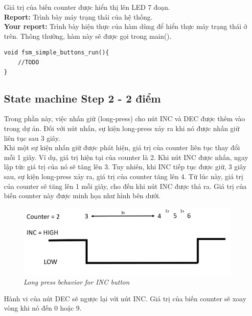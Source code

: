Giá trị của biến counter được hiển thị lên LED 7 đoạn.\\

\textbf{Report: } Trình bày máy trạng thái của hệ thống.\\

\textbf{Your report: } Trình bày hiện thực của hàm dùng để hiển thực máy trạng thái ở trên. Thông thường, hàm này sẽ được gọi trong main().

\begin{lstlisting}[caption=Hiện thực máy trạng thái]
void fsm_simple_buttons_run(){
    //TODO
}
\end{lstlisting}

\subsection{State machine Step 2 - 2 điểm}
Trong phần này, việc nhấn giữ (long-press) cho nút INC và DEC được thêm vào trong dự án. Đối với  nút nhấn, sự kiện long-press xảy ra khi nó được nhấn giữ liên tục sau 3 giây.\\

Khi một sự kiện nhấn giữ được phát hiện, giá trị của counter liên tục thay đổi mỗi 1 giây. Ví dụ, giá trị hiện tại của counter là 2. Khi nút INC được nhấn, ngay lập tức giá trị của nó sẽ tăng lên 3. Tuy nhiên, khi INC tiếp tục được giữ, 3 giây sau, sự kiện long-press xảy ra, giá trị của counter tăng lên 4. Từ lúc này, giá trị của counter sẽ tăng lên 1 mỗi giây, cho đến khi nút INC được thả ra. Giá trị của biến counter này được minh họa như hình bên dưới.


\begin{figure}[!htp]
    \centering
    \includegraphics[width=5in]{source/picture/midterm/inclongpress.PNG}
    \caption{\textit{Long press behavior for INC button}}
    \label{longpress}
\end{figure}

Hành vi của nút DEC sẽ ngược lại với nút INC. Giá trị của biến counter sẽ xoay vòng khi nó đến 0 hoặc 9.\\

